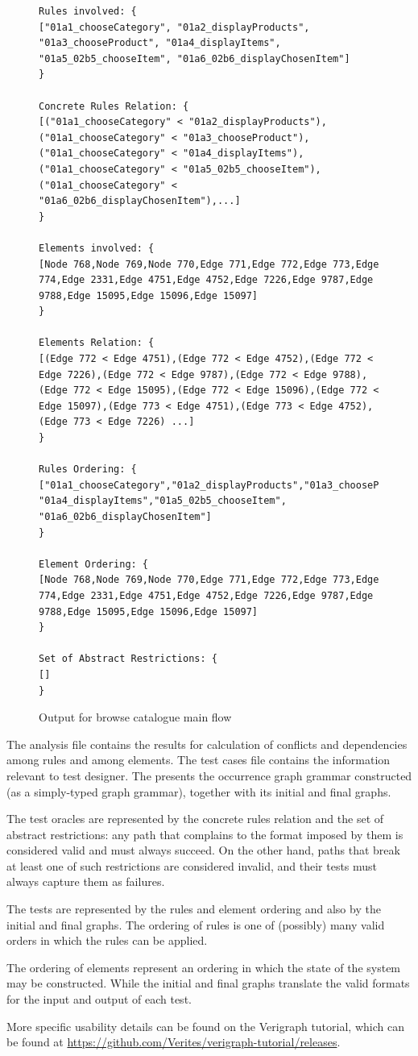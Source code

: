 \begin{figure}[!ht]
\caption{Output for browse catalogue main flow}
\begin{verbatim}
Rules involved: {
["01a1_chooseCategory", "01a2_displayProducts", "01a3_chooseProduct", "01a4_displayItems", "01a5_02b5_chooseItem", "01a6_02b6_displayChosenItem"]
}

Concrete Rules Relation: {
[("01a1_chooseCategory" < "01a2_displayProducts"), ("01a1_chooseCategory" < "01a3_chooseProduct"), ("01a1_chooseCategory" < "01a4_displayItems"), ("01a1_chooseCategory" < "01a5_02b5_chooseItem"), ("01a1_chooseCategory" < "01a6_02b6_displayChosenItem"),...]
}

Elements involved: {
[Node 768,Node 769,Node 770,Edge 771,Edge 772,Edge 773,Edge 774,Edge 2331,Edge 4751,Edge 4752,Edge 7226,Edge 9787,Edge 9788,Edge 15095,Edge 15096,Edge 15097]
}

Elements Relation: {
[(Edge 772 < Edge 4751),(Edge 772 < Edge 4752),(Edge 772 < Edge 7226),(Edge 772 < Edge 9787),(Edge 772 < Edge 9788),(Edge 772 < Edge 15095),(Edge 772 < Edge 15096),(Edge 772 < Edge 15097),(Edge 773 < Edge 4751),(Edge 773 < Edge 4752),(Edge 773 < Edge 7226) ...]
}

Rules Ordering: {
["01a1_chooseCategory","01a2_displayProducts","01a3_chooseProduct", "01a4_displayItems","01a5_02b5_chooseItem", "01a6_02b6_displayChosenItem"]
}

Element Ordering: {
[Node 768,Node 769,Node 770,Edge 771,Edge 772,Edge 773,Edge 774,Edge 2331,Edge 4751,Edge 4752,Edge 7226,Edge 9787,Edge 9788,Edge 15095,Edge 15096,Edge 15097]
}

Set of Abstract Restrictions: {
[]
}
\end{verbatim}
  \label{fig:tests:relation}
\end{figure}
The analysis file contains the results for calculation of conflicts and dependencies among rules and among elements. The test cases file contains the information relevant to test designer.
The  presents the occurrence graph grammar constructed (as a simply-typed graph grammar), together with its initial and final graphs.

The test oracles are represented by the concrete rules relation and the set of abstract restrictions: any path that complains to the format imposed by them is considered valid and must always succeed. On the other hand, paths that break at least one of such restrictions are considered invalid, and their tests must always capture them as failures.

The tests are represented by the rules and element ordering and also by the initial and final graphs. The ordering of rules is one of (possibly) many valid orders in which the rules can be applied.

The ordering of elements represent an ordering in which the state of the system may be constructed. While the initial and final graphs translate the valid formats for the input and output of each test.

More specific usability details can be found on the Verigraph tutorial, which can be found at \url{https://github.com/Verites/verigraph-tutorial/releases}.

